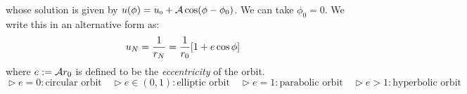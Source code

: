 whose solution is given by $u(\phi) = u_{\text{\tiny 0}} + \mathcal A \cos(\phi-\phi_0)$. We can take $\phi_0=0$. We write this in an alternative form as:
\begin{equation}
    u_N = \frac{1}{r_N} = \frac{1}{r_0}\qty[1+e\cos\phi]
\end{equation}
where $e:=\mathcal A r_0$ is defined to be the \textit{eccentricity} of the orbit. 
$$ \vartriangleright e=0: \text{circular orbit}\quad \vartriangleright e\in (0,1): \text{elliptic orbit}\quad \vartriangleright e=1:\text{parabolic orbit}\quad \vartriangleright e>1: \text{hyperbolic orbit} $$
\begin{figure}[H]
    \centering
    


\begin{tikzpicture}[x=0.75pt,y=0.75pt,yscale=-1,xscale=1]


\end{tikzpicture}
\end{figure}
